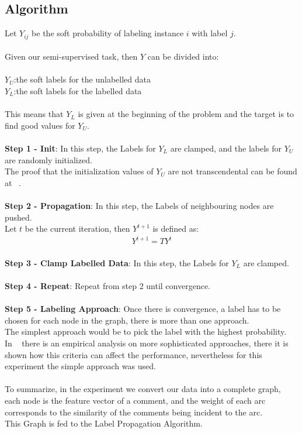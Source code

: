 \documentclass[4pt,a4paper,twocolumn]{article}
\begin{document}
\subsection{Algorithm}
Let $Y_{ij}$ be the soft probability of labeling instance $i$ with label $j$.\\
\\
Given our semi-supervised task, then $Y$ can be divided into:\\
\\
$Y_{U}$:the soft labels for the unlabelled data\\
$Y_{L}$:the soft labels for the labelled data\\
\\
This means that $Y_{L}$ is given at the beginning of the problem
and the target is to find good values for $Y_{U}$.\\
\\
\textbf{Step 1 - Init}: In this step, the Labels for $Y_{L}$ are clamped, and the labels for $Y_{U}$ are randomly initialized.\\
The proof that the initialization values of $Y_{U}$ are not transcendental can be found at ~\cite{Zhu:2005:SLG:1104523}.\\
\\
\textbf{Step 2 - Propagation}: In this step, the Labels of neighbouring nodes are pushed.\\
Let $t$ be the current iteration, then $Y^{t+1}$ is defined as:
\begin{align}
Y^{t+1} = T Y^{t}
\end{align}
\\
\textbf{Step 3 - Clamp Labelled Data}: In this step, the Labels for $Y_{L}$ are clamped.\\
\\
\textbf{Step 4 - Repeat}: Repeat from step 2 until convergence.\\
\\
\textbf{Step 5 - Labeling Approach}: Once there is convergence, a label has to be chosen for each node in the graph, there is more than one approach.\\
The simplest approach would be to pick the label with the highest probability. \\
In ~\cite{Zhu:2005:SLG:1104523} there is an empirical analysis on more sophisticated approaches, there it is shown how this criteria can affect the performance, nevertheless for this experiment the simple approach was used.\\
\\
To summarize, in the experiment we convert our data into a complete graph,
each node is the feature vector of a comment, and the weight of each arc
corresponds to the similarity of the comments being incident to the arc.\\
This Graph is  fed to the Label Propagation Algorithm.
\end{document}
